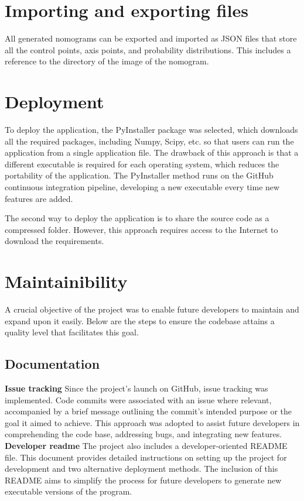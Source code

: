 \documentclass{l4proj}
\begin{document}
\section{Importing and exporting files}

All generated nomograms can be exported and imported as JSON files that store all the control points, axis points, and probability distributions. This includes a reference to the directory of the image of the nomogram. 

\section{Deployment}

To deploy the application, the PyInstaller package was selected, which downloads all the required packages, including Numpy, Scipy, etc. so that users can run the application from a single application file. The drawback of this approach is that a different executable is required for each operating system, which reduces the portability of the application. The PyInstaller method runs on the GitHub continuous integration pipeline, developing a new executable every time new features are added. 

The second way to deploy the application is to share the source code as a compressed folder. However, this approach requires access to the Internet to download the requirements. 
\section{Maintainibility}

A crucial objective of the project was to enable future developers to maintain and expand upon it easily. Below are the steps to ensure the codebase attains a quality level that facilitates this goal. 
\subsection{Documentation}
\textbf{Issue tracking} Since the project's launch on GitHub, issue tracking was implemented. Code commits were associated with an issue where relevant, accompanied by a brief message outlining the commit's intended purpose or the goal it aimed to achieve. This approach was adopted to assist future developers in comprehending the code base, addressing bugs, and integrating new features. 
\newline
\textbf{Developer readme} The project also includes a developer-oriented README file. This document provides detailed instructions on setting up the project for development and two alternative deployment methods. The inclusion of this README aims to simplify the process for future developers to generate new executable versions of the program.
\newline
\end{document}
